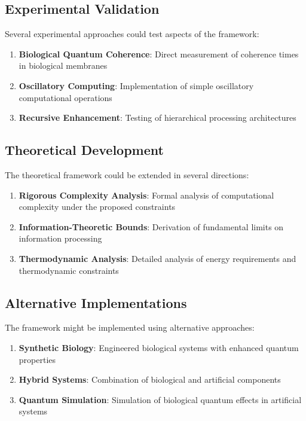 \documentclass[12pt,a4paper]{article}
\theoremstyle{definition}
\begin{document}
{\subsection{Experimental Validation}

Several experimental approaches could test aspects of the framework:

\begin{enumerate}
\item \textbf{Biological Quantum Coherence}: Direct measurement of coherence times in biological membranes
\item \textbf{Oscillatory Computing}: Implementation of simple oscillatory computational operations
\item \textbf{Recursive Enhancement}: Testing of hierarchical processing architectures
\end{enumerate}

\subsection{Theoretical Development}

The theoretical framework could be extended in several directions:

\begin{enumerate}
\item \textbf{Rigorous Complexity Analysis}: Formal analysis of computational complexity under the proposed constraints
\item \textbf{Information-Theoretic Bounds}: Derivation of fundamental limits on information processing
\item \textbf{Thermodynamic Analysis}: Detailed analysis of energy requirements and thermodynamic constraints
\end{enumerate}

\subsection{Alternative Implementations}

The framework might be implemented using alternative approaches:

\begin{enumerate}
\item \textbf{Synthetic Biology}: Engineered biological systems with enhanced quantum properties
\item \textbf{Hybrid Systems}: Combination of biological and artificial components
\item \textbf{Quantum Simulation}: Simulation of biological quantum effects in artificial systems
\end{enumerate}

}
\end{document}
